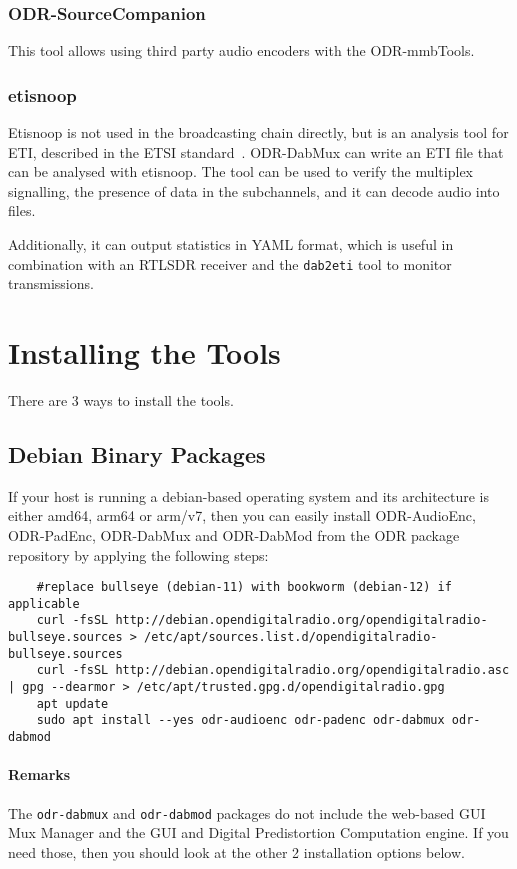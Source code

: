 \subsubsection{ODR-SourceCompanion}
This tool allows using third party audio encoders with the ODR-mmbTools.

\subsubsection{etisnoop}
Etisnoop is not used in the broadcasting chain directly, but is an analysis tool
for ETI, described in the ETSI standard~\cite{etsidabeti}. ODR-DabMux can write
an ETI file that can be analysed with etisnoop. The tool can be used to verify
the multiplex signalling, the presence of data in the subchannels, and it can
decode audio into files.

Additionally, it can output statistics in YAML format, which is useful in
combination with an RTLSDR receiver and the \verb+dab2eti+ tool to monitor
transmissions.

\clearpage
\section{Installing the Tools}
There are 3 ways to install the tools.

\subsection{Debian Binary Packages}
If your host is running a debian-based operating system and its
architecture is either amd64, arm64 or arm/v7, then you can easily install
ODR-AudioEnc, ODR-PadEnc, ODR-DabMux and ODR-DabMod
from the ODR package repository by applying the following steps:

\begin{lstlisting}
    #replace bullseye (debian-11) with bookworm (debian-12) if applicable
    curl -fsSL http://debian.opendigitalradio.org/opendigitalradio-bullseye.sources > /etc/apt/sources.list.d/opendigitalradio-bullseye.sources
    curl -fsSL http://debian.opendigitalradio.org/opendigitalradio.asc | gpg --dearmor > /etc/apt/trusted.gpg.d/opendigitalradio.gpg
    apt update
    sudo apt install --yes odr-audioenc odr-padenc odr-dabmux odr-dabmod
\end{lstlisting}

\paragraph{Remarks}
The \texttt{odr-dabmux} and \texttt{odr-dabmod} packages do not include the web-based GUI Mux Manager
and the GUI and Digital Predistortion Computation engine. If you need those, then you
should look at the other 2 installation options below.

